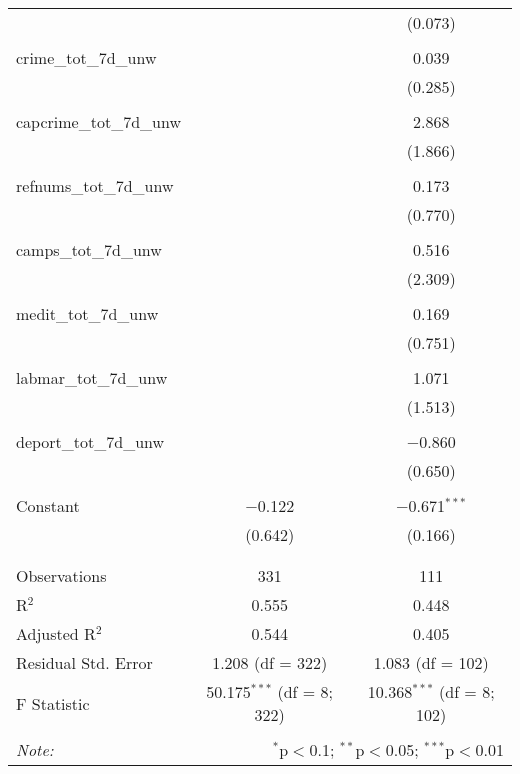 \begin{table}[!htbp]
\begin{tabular}{@{\extracolsep{5pt}}lcc}
  &  & (0.073) \\ 
  & & \\ 
 crime\_tot\_7d\_unw &  & 0.039 \\ 
  &  & (0.285) \\ 
  & & \\ 
 capcrime\_tot\_7d\_unw &  & 2.868 \\ 
  &  & (1.866) \\ 
  & & \\ 
 refnums\_tot\_7d\_unw &  & 0.173 \\ 
  &  & (0.770) \\ 
  & & \\ 
 camps\_tot\_7d\_unw &  & 0.516 \\ 
  &  & (2.309) \\ 
  & & \\ 
 medit\_tot\_7d\_unw &  & 0.169 \\ 
  &  & (0.751) \\ 
  & & \\ 
 labmar\_tot\_7d\_unw &  & 1.071 \\ 
  &  & (1.513) \\ 
  & & \\ 
 deport\_tot\_7d\_unw &  & $-$0.860 \\ 
  &  & (0.650) \\ 
  & & \\ 
 Constant & $-$0.122 & $-$0.671$^{***}$ \\ 
  & (0.642) & (0.166) \\ 
  & & \\ 
\hline \\[-1.8ex] 
Observations & 331 & 111 \\ 
R$^{2}$ & 0.555 & 0.448 \\ 
Adjusted R$^{2}$ & 0.544 & 0.405 \\ 
Residual Std. Error & 1.208 (df = 322) & 1.083 (df = 102) \\ 
F Statistic & 50.175$^{***}$ (df = 8; 322) & 10.368$^{***}$ (df = 8; 102) \\ 
\hline 
\hline \\[-1.8ex] 
\textit{Note:}  & \multicolumn{2}{r}{$^{*}$p$<$0.1; $^{**}$p$<$0.05; $^{***}$p$<$0.01} \\ 
\end{tabular} 
\end{table} 
